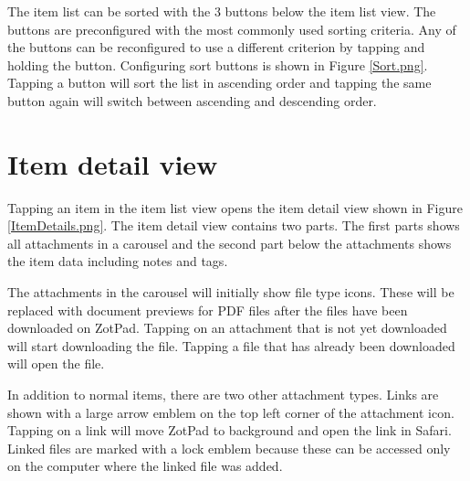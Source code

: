 \documentclass[oneside, openany, 12pt]{tufte-book}
\newcommand{\iphone}[1]{#1}
\newcommand{\ipad}[1]{}
\newcommand{\image}[2]{
	\center
	\fbox{\texttt{[image: images/iPhone/\{\#2]}}}

	\refstepcounter{figure}
	\smallskip\noindent\small Figure \thefigure: #1
	\label{#2}
	}
\newcommand{\ipadfootnote}[1]{}
\newcommand{\iphone}[1]{}
\newcommand{\ipad}[1]{#1}
\newcommand{\image}[2]{
	\caption{#1}
	\label{#2}
	\fbox{\texttt{[image: images/iPad/\{\#2]}}}
	}
\newcommand{\ipadfootnote}[1]{\footnote{#1}}
\begin{document}
\begin{figure}
\image{Configuring the sort buttons}{Sort.png}
\end{figure}

The item list can be sorted with the \ipad{6}\iphone{3} buttons below the item list view. The \ipad{first four} buttons are preconfigured with the most commonly used sorting criteria. Any of the buttons can be reconfigured to use a different criterion by tapping and holding the button. Configuring sort buttons is shown in Figure \ref{Sort.png}. Tapping a button will sort the list in ascending order and tapping the same button again will switch between ascending and descending order. 

\clearpage

\section{Item detail view}

Tapping an item in the item list view opens the item detail view shown in Figure \ref{ItemDetails.png}. \ipad{Opening the item detail view will push the item list into the navigator to allow quickly switching between items.

}The item detail view contains two parts. The first parts shows all attachments in a carousel and the second part below the attachments shows the item data including notes and tags.

The attachments in the carousel will initially show file type icons. These will be replaced with document previews for PDF files after the files have been downloaded on ZotPad. Tapping on an attachment\ipadfootnote{Both imported items and web site snapshots are normal items that can be downloaded and viewed on ZotPad.} that is not yet downloaded will start downloading the file. Tapping a file that has already been downloaded will open the file.

\begin{figure}
\image{Top part of item detail view}{ItemDetails.png}
\end{figure}

In addition to normal items, there are two other attachment types. Links are shown with a large arrow emblem on the top left corner of the attachment icon. Tapping on a link will move ZotPad to background and open the link in Safari. Linked files are marked with a lock emblem because these can be accessed only on the computer where the linked file was added\ipadfootnote{Linked files can be accessed if they are stored in Dropbox and this experimental feature is enabled in the advanced Dropbox settings.}.
\end{document}
